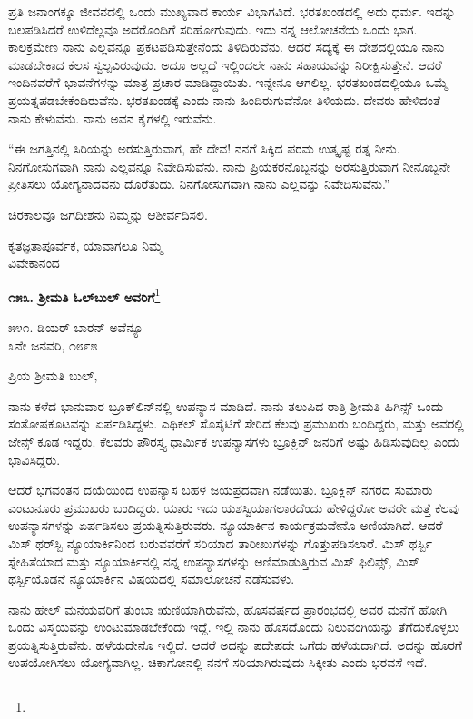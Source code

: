 ಪ್ರತಿ ಜನಾಂಗಕ್ಕೂ ಜೀವನದಲ್ಲಿ ಒಂದು ಮುಖ್ಯವಾದ ಕಾರ್ಯ ವಿಭಾಗವಿದೆ. ಭರತಖಂಡದಲ್ಲಿ ಅದು ಧರ್ಮ. ಇದನ್ನು ಬಲಪಡಿಸಿದರೆ ಉಳಿದೆಲ್ಲವೂ ಅದರೊಂದಿಗೆ ಸರಿಹೋಗುವುದು. ಇದು ನನ್ನ ಆಲೋಚನೆಯ ಒಂದು ಭಾಗ. ಕಾಲಕ್ರಮೇಣ ನಾನು ಎಲ್ಲವನ್ನೂ ಪ್ರಕಟಪಡಿಸುತ್ತೇನೆಂದು ತಿಳಿದಿರುವೆನು. ಆದರೆ ಸದ್ಯಕ್ಕೆ ಈ ದೇಶದಲ್ಲಿಯೂ ನಾನು ಮಾಡಬೇಕಾದ ಕೆಲಸ ಸ್ವಲ್ಪವಿರುವುದು. ಅದೂ ಅಲ್ಲದೆ ಇಲ್ಲಿಂದಲೇ ನಾನು ಸಹಾಯವನ್ನು ನಿರೀಕ್ಷಿಸುತ್ತೇನೆ. ಆದರೆ ಇಂದಿನವರೆಗೆ ಭಾವನೆಗಳನ್ನು ಮಾತ್ರ ಪ್ರಚಾರ ಮಾಡಿದ್ದಾಯಿತು. ಇನ್ನೇನೂ ಆಗಲಿಲ್ಲ. ಭರತಖಂಡದಲ್ಲಿಯೂ ಒಮ್ಮೆ ಪ್ರಯತ್ನಪಡಬೇಕೆಂದಿರುವೆನು. ಭರತಖಂಡಕ್ಕೆ ಎಂದು ನಾನು ಹಿಂದಿರುಗುವೆನೋ ತಿಳಿಯದು. ದೇವರು ಹೇಳಿದಂತೆ ನಾನು ಕೇಳುವೆನು. ನಾನು ಅವನ ಕೈಗಳಲ್ಲಿ ಇರುವೆನು.

``ಈ ಜಗತ್ತಿನಲ್ಲಿ ಸಿರಿಯನ್ನು ಅರಸುತ್ತಿರುವಾಗ, ಹೇ ದೇವ! ನನಗೆ ಸಿಕ್ಕಿದ ಪರಮ ಉತ್ಕೃಷ್ಟ ರತ್ನ ನೀನು. ನಿನಗೋಸುಗವಾಗಿ ನಾನು ಎಲ್ಲವನ್ನೂ ನಿವೇದಿಸುವೆನು. ನಾನು ಪ್ರಿಯಕರನೊಬ್ಬನನ್ನು ಅರಸುತ್ತಿರುವಾಗ ನೀನೊಬ್ಬನೇ ಪ್ರೀತಿಸಲು ಯೋಗ್ಯನಾದವನು ದೊರೆತುದು. ನಿನಗೋಸುಗವಾಗಿ ನಾನು ಎಲ್ಲವನ್ನು ನಿವೇದಿಸುವೆನು.”

ಚಿರಕಾಲವೂ ಜಗದೀಶನು ನಿಮ್ಮನ್ನು ಆಶೀರ್ವದಿಸಲಿ.

{\flushright
ಕೃತಜ್ಞತಾಪೂರ್ವಕ, ಯಾವಾಗಲೂ ನಿಮ್ಮ\\ವಿವೇಕಾನಂದ\par}

\begin{center}
\textbf{೧೫೩. ಶ‍್ರೀಮತಿ ಓಲ್‌ಬುಲ್‌ ಅವರಿಗೆ}\footnote{}
\end{center}

\begin{flushright}
೫೪೧. ಡಿಯರ್ ಬಾರನ್ ಅವೆನ್ಯೂ\\೩ನೇ ಜನವರಿ, ೧೮೯೫
\end{flushright}

\noindent
ಪ್ರಿಯ ಶ‍್ರೀಮತಿ ಬುಲ್,

ನಾನು ಕಳೆದ ಭಾನುವಾರ ಬ್ರೂಕ್‌ಲಿನ್‌ನಲ್ಲಿ ಉಪನ್ಯಾಸ ಮಾಡಿದೆ. ನಾನು ತಲುಪಿದ ರಾತ್ರಿ ಶ‍್ರೀಮತಿ ಹಿಗಿನ್ಸ್ ಒಂದು ಸಂತೋಷಕೂಟವನ್ನು ಏರ್ಪಡಿಸಿದ್ದಳು. ಎಥಿಕಲ್ ಸೊಸೈಟಿಗೆ ಸೇರಿದ ಕೆಲವು ಪ್ರಮುಖರು ಬಂದಿದ್ದರು, ಮತ್ತು ಅವರಲ್ಲಿ ಜೇನ್ಸ್ ಕೂಡ ಇದ್ದರು. ಕೆಲವರು ಪೌರಸ್ತ್ಯ ಧಾರ್ಮಿಕ ಉಪನ್ಯಾಸಗಳು ಬ್ರೂಕ್ಲಿನ್ ಜನರಿಗೆ ಅಷ್ಟು ಹಿಡಿಸುವುದಿಲ್ಲ ಎಂದು ಭಾವಿಸಿದ್ದರು.

ಆದರೆ ಭಗವಂತನ ದಯೆಯಿಂದ ಉಪನ್ಯಾಸ ಬಹಳ ಜಯಪ್ರದವಾಗಿ ನಡೆಯಿತು. ಬ್ರೂಕ್ಲಿನ್ ನಗರದ ಸುಮಾರು ಎಂಟುನೂರು ಪ್ರಮುಖರು ಬಂದಿದ್ದರು. ಯಾರು ಇದು ಯಶಸ್ವಿಯಾಗಲಾರದೆಂದು ಹೇಳಿದ್ದರೋ ಅವರೇ ಮತ್ತೆ ಕೆಲವು ಉಪನ್ಯಾಸಗಳನ್ನು ಏರ್ಪಡಿಸಲು ಪ್ರಯತ್ನಿಸುತ್ತಿರುವರು. ನ್ಯೂಯಾರ್ಕಿನ ಕಾರ್ಯಕ್ರಮವೇನೊ ಅಣಿಯಾಗಿದೆ. ಆದರೆ ಮಿಸ್ ಥರ್‌ಸ್ಬಿ ನ್ಯೂಯಾರ್ಕಿನಿಂದ ಬರುವವರೆಗೆ ಸರಿಯಾದ ತಾರೀಖುಗಳನ್ನು ಗೊತ್ತುಪಡಿಸಲಾರೆ. ಮಿಸ್ ಥರ್ಸ್ಬಿ ಸ್ನೇಹಿತೆಯಾದ ಮತ್ತು ನ್ಯೂಯಾರ್ಕಿನಲ್ಲಿ ನನ್ನ ಉಪನ್ಯಾಸಗಳನ್ನು ಅಣಿಮಾಡುತ್ತಿರುವ ಮಿಸ್ ಫಿಲಿಪ್ಸ್, ಮಿಸ್ ಥರ್ಸ್ಬಿಯೊಡನೆ ನ್ಯೂಯಾರ್ಕಿನ ವಿಷಯದಲ್ಲಿ ಸಮಾಲೋಚನೆ ನಡೆಸುವಳು.

ನಾನು ಹೇಲ್ ಮನೆಯವರಿಗೆ ತುಂಬಾ ಋಣಿಯಾಗಿರುವೆನು, ಹೊಸವರ್ಷದ ಪ್ರಾರಂಭದಲ್ಲಿ ಅವರ ಮನೆಗೆ ಹೋಗಿ ಒಂದು ವಿಸ್ಮಯವನ್ನು ಉಂಟುಮಾಡಬೇಕೆಂದು ಇದ್ದೆ. ಇಲ್ಲಿ ನಾನು ಹೊಸದೊಂದು ನಿಲುವಂಗಿಯನ್ನು ತೆಗೆದುಕೊಳ್ಳಲು ಪ್ರಯತ್ನಿಸುತ್ತಿರುವೆನು. ಹಳೆಯದೇನೊ ಇಲ್ಲಿದೆ. ಆದರೆ ಅದನ್ನು ಪದೇಪದೇ ಒಗೆದು ಹಳೆಯದಾಗಿದೆ. ಅದನ್ನು ಹೊರಗೆ ಉಪಯೋಗಿಸಲು ಯೋಗ್ಯವಾಗಿಲ್ಲ. ಚಿಕಾಗೋನಲ್ಲಿ ನನಗೆ ಸರಿಯಾಗಿರುವುದು ಸಿಕ್ಕೀತು ಎಂದು ಭರವಸೆ ಇದೆ.

